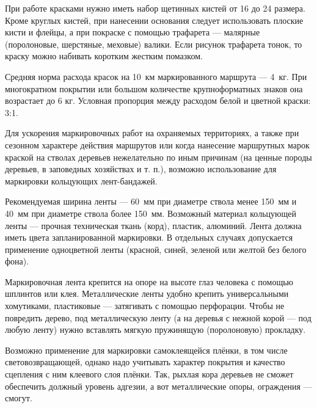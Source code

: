 \documentclass[a4paper,12pt,titlepage]{extarticle}
\begin{document}
При работе красками нужно иметь набор щетинных кистей от 16 до 24 размера. Кроме круглых кистей, при нанесении основания
следует использовать плоские кисти и флейцы, а при покраске с помощью трафарета --- малярные (поролоновые, шерстяные,
меховые) валики. Если рисунок трафарета тонок, то краску можно набивать коротким жестким помазком.

Средняя норма расхода красок на 10~км маркированного маршрута --- 4~кг. При многократном покрытии или большом количестве
крупноформатных знаков она возрастает до 6 кг. Условная пропорция между расходом белой и цветной краски: 3:1.

Для ускорения маркировочных работ на охраняемых территориях, а также при сезонном характере действия маршрутов или когда
нанесение маршрутных марок краской на стволах деревьев нежелательно по иным причинам (на ценные породы деревьев, в
заповедных хозяйствах и т. п.), возможно использование для маркировки кольцующих лент-бандажей.

Рекомендуемая ширина ленты --- 60~мм при диаметре ствола менее 150~мм и 40~мм при диаметре ствола более 150~мм. Возможный
материал кольцующей ленты --- прочная техническая ткань (корд), пластик, алюминий. Лента должна иметь цвета
запланированной маркировки. В отдельных случаях допускается применение одноцветной ленты (красной, синей, зеленой или
желтой без белого фона).

Маркировочная лента крепится на опоре на высоте глаз человека с помощью шплинтов или клея. Металлические ленты удобно
крепить универсальными хомутиками, пластиковые --- затягивать с помощью перфорации. Чтобы не
повредить дерево, под металлическую ленту (а на деревья с нежной корой --- под любую ленту) нужно вставлять мягкую
пружинящую (поролоновую) прокладку.

Возможно применение для маркировки самоклеящейся плёнки, в том числе световозвращающей, однако надо учитывать характер
покрытия и качество сцепления с ним клеевого слоя плёнки. Так, рыхлая кора деревьев не сможет обеспечить должный
уровень адгезии, а вот металлические опоры, ограждения --- смогут.
\end{document}

